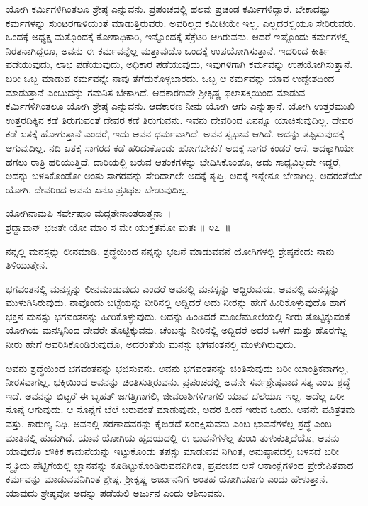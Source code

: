 ಯೋಗಿ ಕರ್ಮಿಗಳಿಗಿಂತಲೂ ಶ್ರೇಷ್ಠ ಎನ್ನುವನು. ಪ್ರಪಂಚದಲ್ಲಿ ಹಲವು ಪ್ರಚಂಡ ಕರ್ಮಿಗಳಿದ್ದಾರೆ. ಬೇಕಾದಷ್ಟು ಕರ್ಮಗಳನ್ನು ಸುಂಟರಗಾಳಿಯಂತೆ ಮಾಡುತ್ತಿರುವರು. ಅವರಿಲ್ಲದ ಕಮಿಟಿಯೇ ಇಲ್ಲ. ಎಲ್ಲದರಲ್ಲಿಯೂ ಸೇರಿರುವರು. ಒಂದಕ್ಕೆ ಅಧ್ಯಕ್ಷ ಮತ್ತೊಂದಕ್ಕೆ ಕೋಶಾಧಿಕಾರಿ, ಇನ್ನೊಂದಕ್ಕೆ ಸೆಕ್ರೆಟರಿ ಆಗಿರುವನು. ಆದರೆ ಇಷ್ಟೊಂದು ಕರ್ಮಗಳಲ್ಲಿ ನಿರತನಾಗಿದ್ದರೂ, ಅವನು ಈ ಕರ್ಮವನ್ನೆಲ್ಲ ಮತ್ತಾವುದೊ ಒಂದಕ್ಕೆ ಉಪಯೋಗಿಸುತ್ತಾನೆ. ಇದರಿಂದ ಕೀರ್ತಿ ಪಡೆಯುವುದು, ಲಾಭ ಪಡೆಯುವುದು, ಅಧಿಕಾರ ಪಡೆಯುವುದು, ಇವುಗಳಿಗಾಗಿ ಕರ್ಮವನ್ನು ಉಪಯೋಗಿಸುತ್ತಾನೆ. ಬರೀ ಒಬ್ಬ ಮಾಡುವ ಕರ್ಮವನ್ನೇ ನಾವು ತೆಗೆದುಕೊಳ್ಳಬಾರದು. ಒಬ್ಬ ಆ ಕರ್ಮವನ್ನು ಯಾವ ಉದ್ದೇಶದಿಂದ ಮಾಡುತ್ತಾನೆ ಎಂಬುದನ್ನು ಗಮನಿಸ ಬೇಕಾಗಿದೆ. ಆದಕಾರಣವೇ ಶ‍್ರೀಕೃಷ್ಣ ಫಲಾಸಕ್ತಿಯಿಂದ ಮಾಡುವ ಕರ್ಮಿಗಳಿಗಿಂತಲೂ ಯೋಗಿ ಶ್ರೇಷ್ಠ ಎನ್ನುವನು. ಆದಕಾರಣ ನೀನು ಯೋಗಿ ಆಗು ಎನ್ನುತ್ತಾನೆ. ಯೋಗಿ ಉತ್ತರಮುಖಿ ಉತ್ತರದಿಕ್ಕಿನ ಕಡೆ ತಿರುಗುವಂತೆ ದೇವರ ಕಡೆ ತಿರುಗುವನು. ಇವನು ದೇವರಿಂದ ಏನನ್ನೂ ಯಾಚಿಸುವುದಿಲ್ಲ. ದೇವರ ಕಡೆ ಏತಕ್ಕೆ ಹೋಗುತ್ತಾನೆ ಎಂದರೆ, ಇದು ಅವನ ಧರ್ಮವಾಗಿದೆ. ಅವನ ಸ್ವಭಾವ ಆಗಿದೆ. ಅದನ್ನು ತಪ್ಪಿಸುವುದಕ್ಕೆ ಆಗುವುದಿಲ್ಲ. ನದಿ ಏತಕ್ಕೆ ಸಾಗರದ ಕಡೆ ಹರಿದುಕೊಂಡು ಹೋಗಬೇಕು? ಅದಕ್ಕೆ ಸಾಗರ ಕಂಡರೆ ಆಸೆ. ಅದಕ್ಕಾಗಿಯೇ ಹಗಲು ರಾತ್ರಿ ಹರಿಯುತ್ತಿದೆ. ದಾರಿಯಲ್ಲಿ ಬರುವ ಆತಂಕಗಳನ್ನು ಭೇದಿಸಿಕೊಂಡೊ, ಅದು ಸಾಧ್ಯವಿಲ್ಲದೇ ಇದ್ದರೆ, ಅದನ್ನು ಬಳಸಿಕೊಂಡೋ ಅಂತು ಸಾಗರವನ್ನು ಸೇರಿದಾಗಲೇ ಅದಕ್ಕೆ ತೃಪ್ತಿ. ಅದಕ್ಕೆ ಇನ್ನೇನೂ ಬೇಕಾಗಿಲ್ಲ. ಅದರಂತೆಯೇ ಯೋಗಿ. ದೇವರಿಂದ ಅವನು ಏನೂ ಪ್ರತಿಫಲ ಬೇಡುವುದಿಲ್ಲ.

\begin{shloka}
ಯೋಗಿನಾಮಪಿ ಸರ್ವೇಷಾಂ ಮದ್ಗತೇನಾಂತರಾತ್ಮನಾ~।\\ಶ್ರದ್ಧಾವಾನ್ ಭಜತೇ ಯೋ ಮಾಂ ಸ ಮೇ ಯುಕ್ತತಮೋ ಮತಃ \hfill॥ ೪೭~॥
\end{shloka}

\begin{artha}
ನನ್ನಲ್ಲಿ ಮನಸ್ಸನ್ನು ಲೀನಮಾಡಿ, ಶ್ರದ್ಧೆಯಿಂದ ನನ್ನನ್ನು ಭಜನೆ ಮಾಡುವವನೆ ಯೋಗಿಗಳಲ್ಲಿ ಶ್ರೇಷ್ಠನೆಂದು ನಾನು ತಿಳಿಯುತ್ತೇನೆ.
\end{artha}

ಭಗವಂತನಲ್ಲಿ ಮನಸ್ಸನ್ನು ಲೀನಮಾಡುವುದು ಎಂದರೆ ಅವನಲ್ಲಿ ಮನಸ್ಸನ್ನು ಅದ್ದಿರುವುದು, ಅವನಲ್ಲಿ ಮನಸ್ಸನ್ನು ಮುಳುಗಿಸಿರುವುದು. ನಾವೊಂದು ಬಟ್ಟೆಯನ್ನು ನೀರಿನಲ್ಲಿ ಅದ್ದಿದರೆ ಅದು ನೀರನ್ನು ಹೇಗೆ ಹೀರಿಕೊಳ್ಳುವುದೊ ಹಾಗೆ ಭಕ್ತನ ಮನಸ್ಸು ಭಗವಂತನನ್ನು ಹೀರಿಕೊಳ್ಳುವುದು. ಅದನ್ನು ಹಿಂಡಿದರೆ ಮೂಲೆಮೂಲೆಯಲ್ಲಿ ನೀರು ತೊಟ್ಟಿಕ್ಕುವಂತೆ ಯೋಗಿಯ ಮನಸ್ಸಿನಿಂದ ದೇವರೇ ತೊಟ್ಟಿಕ್ಕುವನು. ಚೆಂಬನ್ನು ನೀರಿನಲ್ಲಿ ಅದ್ದಿದರೆ ಅದರ ಒಳಗೆ ಮತ್ತು ಹೊರಗೆಲ್ಲ ನೀರು ಹೇಗೆ ಆವರಿಸಿಕೊಂಡಿರುವುದೊ, ಅದರಂತೆಯೆ ಮನಸ್ಸು ಭಗವಂತನಲ್ಲಿ ಮುಳುಗಿರುವುದು. 

ಅವನು ಶ್ರದ್ಧೆಯಿಂದ ಭಗವಂತನನ್ನು ಭಜಿಸುವನು. ಅವನು ಭಗವಂತನನ್ನು ಚಿಂತಿಸುವುದು ಬರೀ ಯಾಂತ್ರಿಕವಾಗಲ್ಲ, ನೀರಸವಾಗಲ್ಲ. ಭಕ್ತಿಯಿಂದ ಅವನನ್ನು ಚಿಂತಿಸುತ್ತಿರುವನು. ಪ್ರಪಂಚದಲ್ಲಿ ಅವನೇ ಸರ್ವಶ್ರೇಷ್ಠವಾದ ಸತ್ಯ ಎಂಬ ಶ್ರದ್ಧೆ ಇದೆ. ಅವನನ್ನು ಬಿಟ್ಟರೆ ಈ ಬೃಹತ್ ಜಗತ್ತಿಗಾಗಲಿ, ಜೀವರಾಶಿಗಳಿಗಾಗಲಿ ಯಾವ ಬೆಲೆಯೂ ಇಲ್ಲ. ಅದೆಲ್ಲ ಬರೀ ಸೊನ್ನೆ ಆಗುವುದು. ಆ ಸೊನ್ನೆಗೆ ಬೆಲೆ ಬರುವಂತೆ ಮಾಡುವುದು, ಅದರ ಹಿಂದೆ ಇರುವ ಒಂದು. ಅವನೇ ಪವಿತ್ರತಮ ವಸ್ತು, ಕಾರುಣ್ಯ ನಿಧಿ, ಅವನಲ್ಲಿ ಶರಣಾದವರನ್ನು ಕೈಬಿಡದೆ ಸಂರಕ್ಷಿಸುವನು ಎಂಬ ಭಾವನೆಗಳೆಲ್ಲ ಶ್ರದ್ಧೆ ಎಂಬ ಮಾತಿನಲ್ಲಿ ಹುದುಗಿದೆ. ಯಾವ ಯೋಗಿಯ ಹೃದಯದಲ್ಲಿ ಈ ಭಾವನೆಗಳೆಲ್ಲ ತುಂಬಿ ತುಳುಕುತ್ತಿದೆಯೊ, ಅವನು ಯಾವುದೊ ಲೌಕಿಕ ಕಾಮನೆಯನ್ನು ಇಟ್ಟುಕೊಂಡು ತಪಸ್ಸು ಮಾಡುವವ ನಿಗಿಂತ, ಅನುಷ್ಠಾನದಲ್ಲಿ ಬಳಸದೆ ಬರೀ ಸ್ಮೃತಿಯ ಪೆಟ್ಟಿಗೆಯಲ್ಲಿ ಜ್ಞಾನವನ್ನು ಕೂಡಿಟ್ಟುಕೊಂಡಿರುವವನಿಗಿಂತ, ಪ್ರಪಂಚದ ಆಸೆ ಆಕಾಂಕ್ಷೆಗಳಿಂದ ಪ್ರೇರೇಪಿತವಾದ ಕರ್ಮವನ್ನು ಮಾಡುವವನಿಗಿಂತ ಶ್ರೇಷ್ಠ. ಶ‍್ರೀಕೃಷ್ಣ ಅರ್ಜುನನಿಗೆ ಅಂತಹ ಯೋಗಿಯಾಗು ಎಂದು ಹೇಳುತ್ತಾನೆ. ಯಾವುದು ಶ್ರೇಷ್ಠವೋ ಅದನ್ನು ಪಡೆಯಲಿ ಅರ್ಜುನ ಎಂದು ಆಶಿಸುವನು. 

